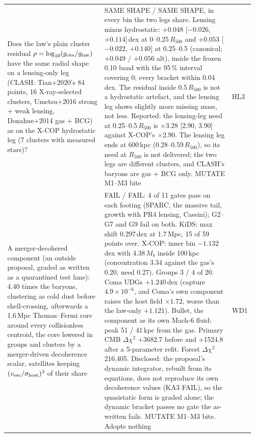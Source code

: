 \documentclass[10pt]{article}
\begin{document}
\begin{longtable}{@{}p{4.4cm}p{8.6cm}p{2.8cm}@{}}
Does the law's plain cluster residual $\rho=\log_{10}(g_{\rm obs}/g_{\rm law})$ have the same radial shape on a lensing-only leg (CLASH: Tian+2020's 84 points, 16 X-ray-selected clusters, Umetsu+2016 strong + weak lensing, Donahue+2014 gas + BCG) as on the X-COP hydrostatic leg (7 clusters with measured stars)? & SAME SHAPE / SAME SHAPE, in every bin the two legs share. Lensing minus hydrostatic: $+0.048$ [$-0.026$, $+0.114$]\,dex at 0--0.25\,$R_{500}$ and $+0.053$ [$-0.022$, $+0.140$] at 0.25--0.5 (canonical; $+0.049$ / $+0.056$ alt), inside the frozen 0.10 band with the 95\,\% interval covering 0; every bracket within 0.04\,dex. The residual inside 0.5\,$R_{500}$ is not a hydrostatic artefact, and the lensing leg shows slightly more missing mass, not less. Reported: the lensing-leg need at 0.25--0.5\,$R_{500}$ is $\times3.28$ [2.90, 3.90] against X-COP's $\times2.90$. The lensing leg ends at 600\,kpc (0.28--0.59\,$R_{500}$), so its need at $R_{500}$ is not delivered; the two legs are different clusters, and CLASH's baryons are gas + BCG only. MUTATE M1--M3 bite & HL3\\
A merger-decohered component (an outside proposal, graded as written as a quarantined test lane): 4.40 times the baryons, clustering as cold dust before shell-crossing, afterwards a 1.6\,Mpc Thomas--Fermi core around every collisionless centroid, the core lowered in groups and clusters by a merger-driven decoherence scalar, satellites keeping $(v_{\rm esc}/\sigma_{\rm host})^3$ of their share & FAIL / FAIL: 4 of 11 gates pass on each footing (SPARC, the massive tail, growth with PR4 lensing, Cassini); G2--G7 and G9 fail on both. KiDS: max shift 0.297\,dex at 1.7\,Mpc, 15 of 59 points over. X-COP: inner bin $-1.132$\,dex with 4.38\,$M_b$ inside 100\,kpc (concentration 3.34 against the gas's 0.20, need 0.27). Groups 3 / 4 of 20. Coma UDGs $+1.240$\,dex (capture $4.9\times10^{-6}$, and Coma's own component raises the host field $\times1.72$, worse than the law-only $+1.121$). Bullet, the component as its own Mach-6 fluid: peak 51 / 41\,kpc from the gas. Primary CMB $\Delta\chi^2$ +3682.7 before and +1524.8 after a 5-parameter refit. Forest $\Delta\chi^2$ 216,405. Disclosed: the proposal's dynamic integrator, rebuilt from its equations, does not reproduce its own decoherence values (KA3 FAIL), so the quasistatic form is graded alone; the dynamic bracket passes no gate the as-written fails. MUTATE M1--M3 bite. Adopts nothing & WD1\\

\end{longtable}
\end{document}
